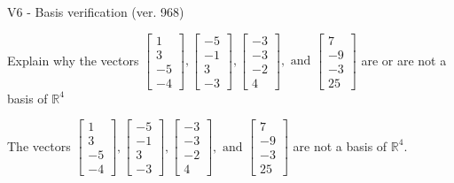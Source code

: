 \begin{exercise}
  \begin{exerciseTitle}V6 - Basis verification (ver. 968)\end{exerciseTitle}
  \begin{exerciseStatement}
    Explain why the vectors \(\left[\begin{array}{r}
1 \\
3 \\
-5 \\
-4
\end{array}\right] , \left[\begin{array}{r}
-5 \\
-1 \\
3 \\
-3
\end{array}\right] , \left[\begin{array}{r}
-3 \\
-3 \\
-2 \\
4
\end{array}\right] , \text{ and } \left[\begin{array}{r}
7 \\
-9 \\
-3 \\
25
\end{array}\right]\) are or are not a basis of \(\mathbb{R}^4\)	


  \end{exerciseStatement}
  \begin{exerciseAnswer}
   The vectors \(\left[\begin{array}{r}
1 \\
3 \\
-5 \\
-4
\end{array}\right] , \left[\begin{array}{r}
-5 \\
-1 \\
3 \\
-3
\end{array}\right] , \left[\begin{array}{r}
-3 \\
-3 \\
-2 \\
4
\end{array}\right] , \text{ and } \left[\begin{array}{r}
7 \\
-9 \\
-3 \\
25
\end{array}\right]\) 
  	 are not  a basis of \(\mathbb{R}^4\).
  


  \end{exerciseAnswer}
\end{exercise}